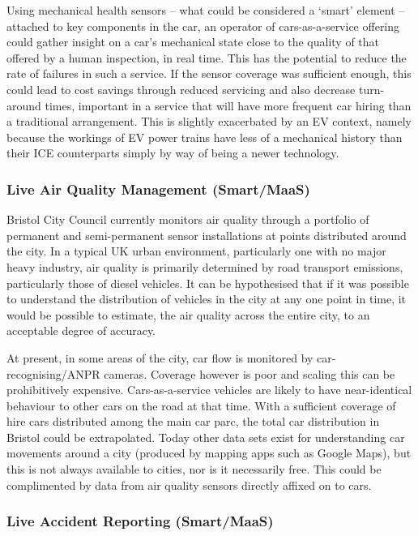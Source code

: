 \documentclass[b5paper,10pt]{article}
\begin{document}
Using mechanical health sensors -- what could be considered a `smart'
element -- attached to key components in the car, an operator of
cars-as-a-service offering could gather insight on a car's mechanical
state close to the quality of that offered by a human inspection, in
real time. This has the potential to reduce the rate of failures in
such a service. If the sensor coverage was sufficient enough, this
could lead to cost savings through reduced servicing and also decrease
turn-around times, important in a service that will have more frequent
car hiring than a traditional arrangement. This is slightly
exacerbated by an EV context, namely because the workings of EV power
trains have less of a mechanical history than their ICE counterparts
simply by way of being a newer technology.

\subsubsection{Live Air Quality Management (Smart/MaaS)}

Bristol City Council currently monitors air quality through a
portfolio of permanent and semi-permanent sensor installations at
points distributed around the city. In a typical UK urban environment,
particularly one with no major heavy industry, air quality is
primarily determined by road transport emissions, particularly those
of diesel vehicles. It can be hypothesised that if it was possible to
understand the distribution of vehicles in the city at any one point
in time, it would be possible to estimate, the air quality across the
entire city, to an acceptable degree of accuracy.

At present, in some areas of the city, car flow is monitored by
car-recognising/ANPR cameras. Coverage however is poor and scaling
this can be prohibitively expensive. Cars-as-a-service vehicles are
likely to have near-identical behaviour to other cars on the road at
that time. With a sufficient coverage of hire cars distributed among
the main car parc, the total car distribution in Bristol could be
extrapolated. Today other data sets exist for understanding car
movements around a city (produced by mapping apps such as Google
Maps), but this is not always available to cities, nor is it
necessarily free. This could be complimented by data from air quality
sensors directly affixed on to cars.



\subsubsection{Live Accident Reporting (Smart/MaaS)}
\end{document}

